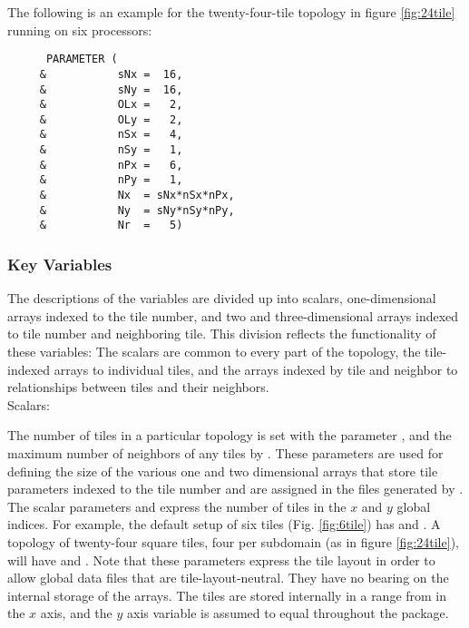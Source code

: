 The following is an example for the twenty-four-tile topology in
figure \ref{fig:24tile} running on six processors:

\begin{verbatim}
      PARAMETER (
     &           sNx =  16,
     &           sNy =  16,
     &           OLx =   2,
     &           OLy =   2,
     &           nSx =   4,
     &           nSy =   1,
     &           nPx =   6,
     &           nPy =   1,
     &           Nx  = sNx*nSx*nPx,
     &           Ny  = sNy*nSy*nPy,
     &           Nr  =   5)
\end{verbatim}


\subsubsection{Key Variables}

The descriptions of the variables are divided up into scalars,
one-dimensional arrays indexed to the tile number, and two and
three-dimensional arrays indexed to tile number and neighboring tile.
This division reflects the functionality of these variables: The
scalars are common to every part of the topology, the tile-indexed
arrays to individual tiles, and the arrays indexed by tile and
neighbor to relationships between tiles and their neighbors. \\

Scalars:

The number of tiles in a particular topology is set with the parameter
, and the maximum number of neighbors of any tiles by
.  These parameters are used for defining the
size of the various one and two dimensional arrays that store tile
parameters indexed to the tile number and are assigned in the files
generated by .\\

The scalar parameters 
and  express the number
of tiles in the $x$ and $y$ global indices.  For example, the default
setup of six tiles (Fig. \ref{fig:6tile}) has
 and .  A
topology of twenty-four square tiles, four per subdomain (as in figure
\ref{fig:24tile}), will have  and
.  Note that these parameters express the
tile layout in order to allow global data files that are tile-layout-neutral.
They have no bearing on the internal storage of the arrays.  The tiles
are stored internally in a range from  in the
$x$ axis, and the $y$ axis variable  is assumed to 
equal  throughout the package. \\

